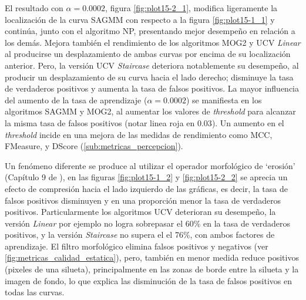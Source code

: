 El resultado con $\alpha=0.0002$, figura \ref{fig:plot15-2_1}, modifica ligeramente la localización de la curva SAGMM con respecto a la figura \ref{fig:plot15-1_1} y continúa, junto con el algoritmo NP, presentando mejor desempeño en relación a los demás. Mejora también el rendimiento de los algoritmos MOG2 y UCV \textit{Linear} al producirse un desplazamiento de ambas curvas por encima de su localización anterior. Pero, la versión UCV \textit{Staircase} deteriora notablemente su desempeño, al producir un desplazamiento de su curva hacia el lado derecho; disminuye la tasa de verdaderos positivos y aumenta la tasa de falsos positivos. La mayor influencia del aumento de la tasa de aprendizaje ($\alpha=0.0002$) se manifiesta en los algoritmos SAGMM y MOG2, al aumentar los valores de \textit{threshold} para alcanzar la misma tasa de falsos positivos (notar linea roja en $0.03$). Un aumento en el \textit{threshold} incide en una mejora de las medidas de rendimiento como MCC, FMeasure, y DScore (\ref{sub:metricas_percepcion}). 

Un fenómeno diferente se produce al utilizar el operador morfológico de `erosión' (Capítulo 9 de \cite{digital_image_processing_gonzalez}), en las figuras \ref{fig:plot15-1_2} y \ref{fig:plot15-2_2} se aprecia un efecto de compresión hacia el lado izquierdo de las gráficas, es decir, la tasa de falsos positivos disminuyen y en una proporción menor la tasa de verdaderos positivos. Particularmente los algoritmos UCV deterioran su desempeño, la versión \textit{Linear} por ejemplo no logra sobrepasar el 60\% en la tasa de verdaderos positivos, y la versión \textit{Staircase} no supera el el 76\%, con ambos factores de aprendizaje. El filtro morfológico elimina falsos positivos y negativos (ver \ref{fig:metricas_calidad_estatica}), pero, también en menor medida reduce positivos (pixeles de una silueta), principalmente en las zonas de borde entre la silueta y la imagen de fondo, lo que explica las disminución de la tasa de falsos positivos en todas las curvas.



